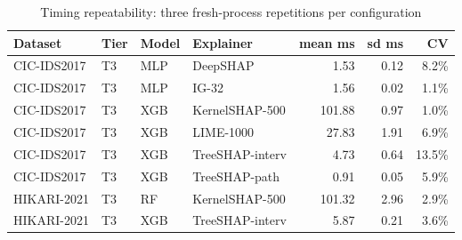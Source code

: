 \begin{table}[!htbp]
\centering
\caption{Timing repeatability: three fresh-process repetitions per configuration}
\label{tab:timingrep}
\scriptsize
\setlength{\tabcolsep}{3.5pt}
\begin{tabular}{llllrrr}
\toprule
\textbf{Dataset} & \textbf{Tier} & \textbf{Model} & \textbf{Explainer} & \textbf{mean ms} & \textbf{sd ms} & \textbf{CV} \\
\midrule
CIC-IDS2017 & T3 & MLP & DeepSHAP & 1.53 & 0.12 & 8.2\% \\
CIC-IDS2017 & T3 & MLP & IG-32 & 1.56 & 0.02 & 1.1\% \\
CIC-IDS2017 & T3 & XGB & KernelSHAP-500 & 101.88 & 0.97 & 1.0\% \\
CIC-IDS2017 & T3 & XGB & LIME-1000 & 27.83 & 1.91 & 6.9\% \\
CIC-IDS2017 & T3 & XGB & TreeSHAP-interv & 4.73 & 0.64 & 13.5\% \\
CIC-IDS2017 & T3 & XGB & TreeSHAP-path & 0.91 & 0.05 & 5.9\% \\
HIKARI-2021 & T3 & RF & KernelSHAP-500 & 101.32 & 2.96 & 2.9\% \\
HIKARI-2021 & T3 & XGB & TreeSHAP-interv & 5.87 & 0.21 & 3.6\% \\
\bottomrule
\end{tabular}
\end{table}
